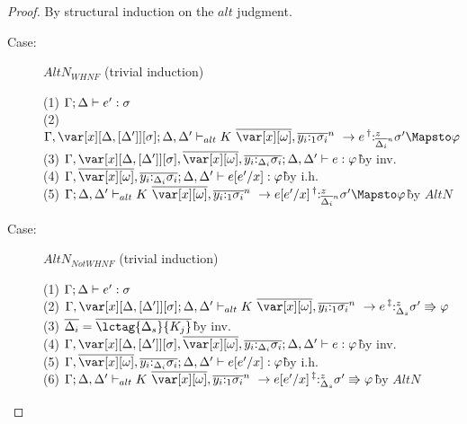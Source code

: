 \begin{proof}
By structural induction on the $alt$ judgment.

\begin{description}
\item[Case:] $AltN_{WHNF}$ (trivial induction)
\begin{tabbing}
  (1) $\Gamma; \Delta \vdash e' : \sigma$\\
  (2) $\G,\xD; \D,\D' \vdash_{alt} \konstructor~\to e \prescript{\dag}{}{:^z_{\ov{\D_i}^n}} \s' \Mapsto \vp$\\
  (3) $\G,\xD,\ov{\xo},\ov{y_i{:}_{\D_i}\s_i}; \D, \D' \vdash e : \vp$\` by inv.\\
  (4) $\G,\ov{\xo},\ov{y_i{:}_{\D_i}\s_i}; \D, \D' \vdash e[e'/x] : \vp$\` by i.h.\\
  (5) $\G; \D,\D' \vdash_{alt} \konstructor~\to e[e'/x] \prescript{\dag}{}{:^z_{\ov{\D_i}^n}} \s' \Mapsto \vp$\` by $AltN$\\
\end{tabbing}

\item[Case:] $AltN_{Not WHNF}$ (trivial induction)
\begin{tabbing}
  (1) $\Gamma; \Delta \vdash e' : \sigma$\\
  (2) $\G,\xD; \D,\D' \vdash_{alt} \konstructor~\to e \prescript{\ddag}{}{:^z_{\D_s}} \s' \Rrightarrow \vp$\\
  (3) $\ov{\D_i} = \ov{\lctag{\D_s}{K_j}}$\`by inv.\\
  (4) $\G,\xD,\ov{\xo},\ov{y_i{:}_{\D_i}\s_i}; \D, \D' \vdash e : \vp$\` by inv.\\
  (5) $\G,\ov{\xo},\ov{y_i{:}_{\D_i}\s_i}; \D, \D' \vdash e[e'/x] : \vp$\` by i.h.\\
  (6) $\G; \D,\D' \vdash_{alt} \konstructor~\to e[e'/x] \prescript{\ddag}{}{:^z_{\D_s}} \s' \Rrightarrow \vp$\` by $AltN$\\
\end{tabbing}


\end{description}
\end{proof}
